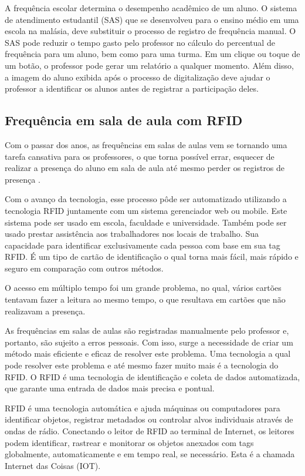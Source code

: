\documentclass[12pt]{article}
\begin{document}
A frequência escolar determina o desempenho acadêmico de um aluno. O sistema de atendimento estudantil (SAS) que se desenvolveu para o ensino médio em uma escola na malásia, deve substituir o processo de registro de frequência manual. O SAS pode reduzir o tempo gasto pelo professor no cálculo do percentual de frequência para um aluno, bem como para uma turma. Em um clique ou toque de um botão, o professor pode gerar um relatório a qualquer momento. Além disso, a imagem do aluno exibida após o processo de digitalização deve ajudar o professor a identificar os alunos antes de registrar a participação deles.\cite{BarCode}



\subsection{Frequência em sala de aula com RFID}
Com o passar dos anos, as frequências em salas de aulas vem se tornando uma tarefa cansativa para os professores, o que torna possível errar, esquecer de realizar a presença do aluno em sala de aula até mesmo perder os registros de presença \cite{Africa}.

Com o avanço da tecnologia, esse processo pôde ser automatizado utilizando a tecnologia RFID juntamente com um sistema gerenciador web ou mobile.\cite{Africa}
Este sistema pode ser usado em escola, faculdade e universidade. Também pode ser usado prestar assistência aos trabalhadores nos locais de trabalho. Sua capacidade para identificar exclusivamente cada pessoa com base em sua tag RFID. É um tipo de cartão de identificação o qual torna mais fácil, mais rápido e seguro em comparação com outros métodos.\cite{RFIDFrequencia}

O acesso em múltiplo tempo foi um grande problema, no qual, vários cartões tentavam fazer a leitura ao mesmo tempo, o que resultava em cartões que não realizavam a presença.\cite{Africa}


As frequências em salas de aulas são registradas manualmente pelo professor e, portanto, são sujeito a erros pessoais. Com isso, surge a necessidade de criar um método mais eficiente e eficaz de resolver este problema\cite{RFIDemSala}. Uma tecnologia a qual pode resolver este problema e até mesmo fazer muito mais é a tecnologia do RFID\cite{RFIDemSala}.
O RFID é uma tecnologia de identificação e coleta de dados automatizada, que garante uma entrada de dados mais precisa e pontual. 

RFID é uma tecnologia automática e ajuda máquinas ou computadores para identificar objetos, registrar metadados ou controlar alvos individuais através de ondas de rádio. Conectando o leitor de RFID ao terminal de Internet, os leitores podem identificar, rastrear e monitorar os objetos anexados com tags globalmente, automaticamente e em tempo real, se necessário. Esta é a chamada Internet das Coisas (IOT).\cite{RFID2}
\end{document}
